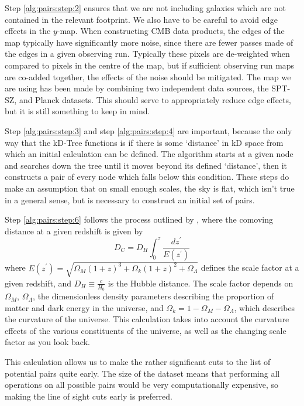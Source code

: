 \par Step \ref{alg:pairs:step:2} ensures that we are not including galaxies which are not contained in the relevant footprint. We also have to be careful to avoid edge effects in the $y$-map. When constructing CMB data products, the edges of the map typically have significantly more noise, since there are fewer passes made of the edges in a given observing run. Typically these pixels are de-weighted when compared to pixels in the centre of the map, but if sufficient observing run maps are co-added together, the effects of the noise should be mitigated. The map we are using has been made by combining two independent data sources, the SPT-SZ, and Planck datasets. This should serve to appropriately reduce edge effects, but it is still something to keep in mind.

\par Step \ref{alg:pairs:step:3} and step \ref{alg:pairs:step:4} are important, because the only way that the kD-Tree functions is if there is some `distance' in kD space from which an initial calculation can be defined. The algorithm starts at a given node and searches down the tree until it moves beyond its defined `distance', then it constructs a pair of every node which falls below this condition. These steps do make an assumption that on small enough scales, the sky is flat, which isn't true in a general sense, but is necessary to construct an initial set of pairs.

\par Step \ref{alg:pairs:step:6} follows the process outlined by \cite{1999astro.ph..5116H}, where the comoving distance at a given redshift is given by 
\begin{equation}
D_C = D_H \int_0^z \frac{dz^\prime}{E(z^\prime)}
\label{eq:comov_dist}
\end{equation}
where $E(z^\prime) = \sqrt{\Omega_M (1+z)^3 + \Omega_k (1+z)^2 + \Omega_\Lambda}$ defines the scale factor at a given redshift, and $D_H \equiv \frac{c}{H_0}$ is the Hubble distance. The scale factor depends on $\Omega_M$, $\Omega_\Lambda$, the dimensionless density parameters describing the proportion of matter and dark energy in the universe, and $\Omega_k = 1 - \Omega_M - \Omega_\Lambda$, which describes the curvature of the universe. This calculation takes into account the curvature effects of the various constituents of the universe, as well as the changing scale factor as you look back.

\par This calculation allows us to make the rather significant cuts to the list of potential pairs quite early. The size of the dataset means that performing all operations on all possible pairs would be very computationally expensive, so making the line of sight cuts early is preferred. 

